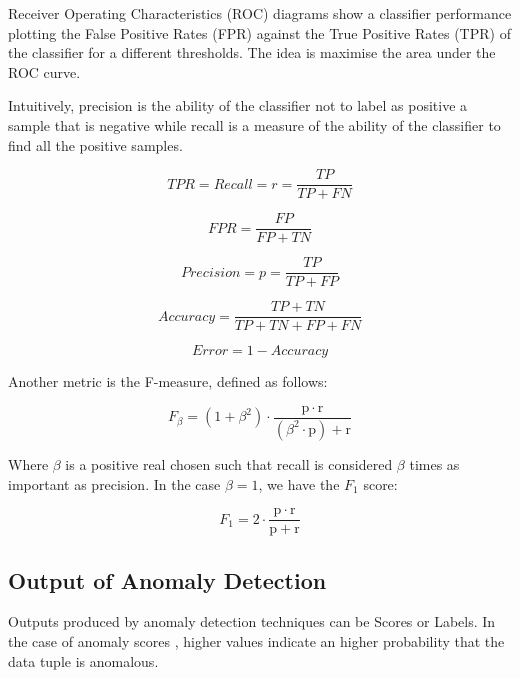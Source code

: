 Receiver Operating Characteristics (ROC) diagrams show a classifier performance plotting the False Positive Rates (FPR) against the True Positive Rates (TPR) of the classifier for a different thresholds. The idea is maximise the area under the ROC curve.

Intuitively, precision is the ability of the classifier not to label as positive a sample that is negative while recall is a measure of the ability of the classifier to find all the positive samples. \cite{scikit-learn}


\begin{equation}
	TPR = Recall = r = \frac{TP}{TP+FN}
\end{equation}

\begin{equation}
	FPR = \frac{FP}{FP+TN}
\end{equation}

\begin{equation}
	Precision = p = \frac{TP}{TP+FP}
\end{equation}

\begin{equation}
	Accuracy = \frac{TP+TN}{TP+TN+FP+FN}
\end{equation}

\begin{equation}
	Error = 1 - Accuracy
\end{equation}

Another metric is the F-measure, defined as follows:

\begin{equation}
	F_\beta = (1 + \beta^2) \cdot \frac{\mathrm{p} \cdot \mathrm{r}}{(\beta^2 \cdot \mathrm{p}) + \mathrm{r}}
\end{equation}

Where $\beta$ is a positive real chosen such that recall is considered $\beta$ times as important as precision. In the case $\beta = 1$, we have the $F_1$ score:

\begin{equation}
	F_1 = 2 \cdot \frac{\mathrm{p} \cdot \mathrm{r}}{\mathrm{p} + \mathrm{r}}
\end{equation}



\subsection{Output of Anomaly Detection}

Outputs produced by anomaly detection techniques can be Scores or Labels. In the case of anomaly scores \cite{chandola2009anomaly}, higher values indicate an higher probability that the data tuple is anomalous.